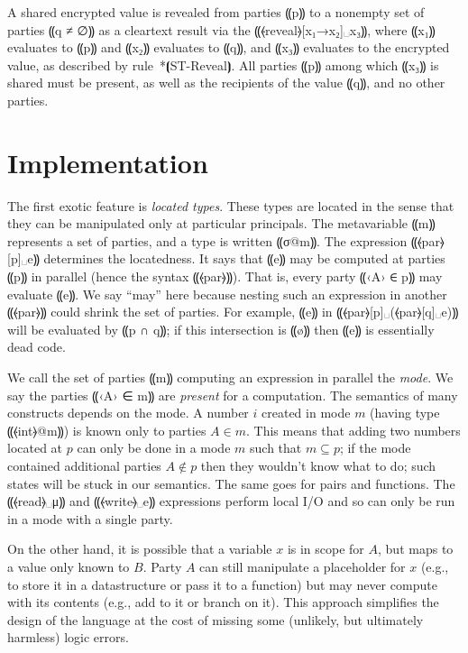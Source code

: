 A shared encrypted value is revealed from parties ⸨p⸩ to a nonempty set of
parties ⸨q ≠ ∅⸩ as a cleartext result via the ⸨⦑reveal⦒[x₁→x₂]␣x₃⸩, where ⸨x₁⸩
evaluates to ⸨p⸩ and ⸨x₂⸩ evaluates to ⸨q⸩, and ⸨x₃⸩ evaluates to the encrypted
value, as described by rule~*⦗ST-Reveal⦘. All parties ⸨p⸩ among which ⸨x₃⸩
is shared must be present, as well as the recipients of the value ⸨q⸩, and no
other parties. %

\section{Implementation}
\label{sec:mpc-impl}






The first exotic feature is \emph{located types}. These types are located
in the sense that they can be manipulated only at particular principals.
The metavariable ⸨m⸩ represents a set of parties, and a type is written ⸨σ@m⸩. The \mpc expression
⸨⦑par⦒[p]␣e⸩ determines the locatedness. It says that ⸨e⸩ may be computed at
parties ⸨p⸩ in parallel (hence the syntax ⸨⦑par⦒⸩). That is, every
party ⸨‹A› ∈ p⸩ may evaluate ⸨e⸩. We say ``may'' here because
nesting such an expression in another ⸨⦑par⦒⸩ could shrink the set of
parties. For example, ⸨e⸩ in ⸨⦑par⦒[p]␣(⦑par⦒[q]␣e)⸩ will be
evaluated by ⸨p ∩ q⸩; if this intersection is ⸨ø⸩ then ⸨e⸩
is essentially dead code.

We call the set of parties ⸨m⸩ computing an expression in parallel
the \emph{mode}. We say the parties ⸨‹A› ∈ m⸩ are \emph{present}
for a computation. The semantics of many constructs depends on the
mode. A number $i$ created in mode $m$ (having type ⸨⦑int⦒@m⸩) is
known only to parties $A \in m$. This means that adding two numbers
located at $p$ can only be done in a mode $m$ such that
$m \subseteq p$; if the mode contained additional parties
$A \not\in p$ then they wouldn't know what to do; such states will be
stuck in our semantics. The same goes for pairs and functions.
The ⸨⦑read⦒␣μ⸩ and ⸨⦑write⦒␣e⸩ expressions perform local
I/O and so can only be run in a mode with a single party.

On the other hand, it is possible that a variable $x$ is in scope for
$A$, but maps to a value only known to $B$. Party $A$ can
still manipulate a placeholder for $x$ (e.g., to store it in a
datastructure or pass it to a function) but may never compute with its
contents (e.g., add to it or branch on it). This approach
simplifies the design of the language at the cost of missing some
(unlikely, but ultimately harmless) logic errors.

